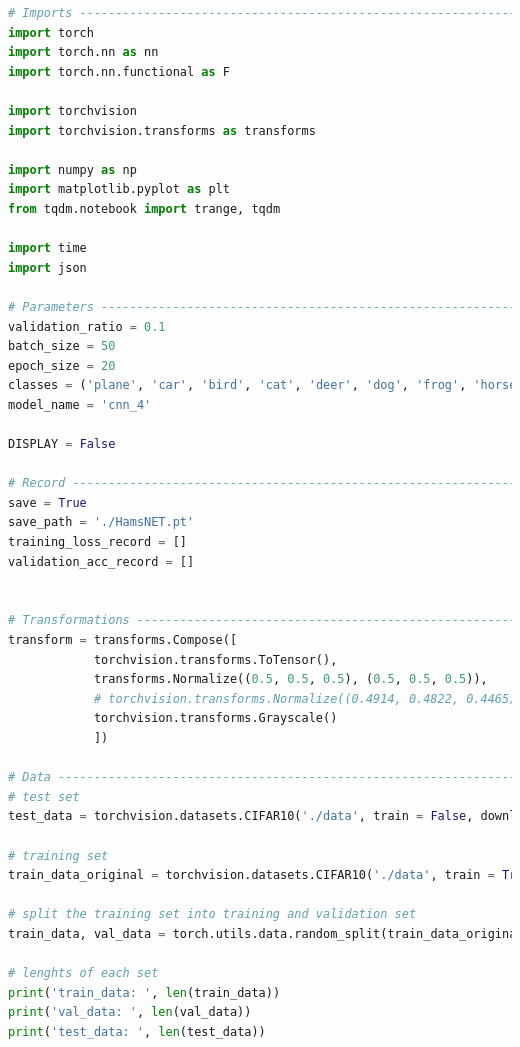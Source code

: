 \documentclass[3p,times,procedia]{elsarticle}
\begin{document}
\begin{lstlisting}[language=Python]
# Imports --------------------------------------------------------------------------------------------------------------------------------------------#
import torch
import torch.nn as nn
import torch.nn.functional as F

import torchvision
import torchvision.transforms as transforms

import numpy as np
import matplotlib.pyplot as plt
from tqdm.notebook import trange, tqdm

import time
import json

# Parameters ------------------------------------------------------------------------------------------------------------------------------------#
validation_ratio = 0.1
batch_size = 50
epoch_size = 20
classes = ('plane', 'car', 'bird', 'cat', 'deer', 'dog', 'frog', 'horse', 'ship', 'truck')
model_name = 'cnn_4'

DISPLAY = False

# Record ----------------------------------------------------------------------------------------------------------------------------------------------#
save = True
save_path = './HamsNET.pt'
training_loss_record = []
validation_acc_record = []


# Transformations ------------------------------------------------------------------------------------------------------------------------------------#
transform = transforms.Compose([
            torchvision.transforms.ToTensor(),
            transforms.Normalize((0.5, 0.5, 0.5), (0.5, 0.5, 0.5)),
            # torchvision.transforms.Normalize((0.4914, 0.4822, 0.4465), (0.247, 0.243, 0.261)),
            torchvision.transforms.Grayscale()
            ])

# Data ----------------------------------------------------------------------------------------------------------------------------------------------#
# test set
test_data = torchvision.datasets.CIFAR10('./data', train = False, download = True, transform = transform)

# training set
train_data_original = torchvision.datasets.CIFAR10('./data', train = True, download = True,transform = transform)

# split the training set into training and validation set
train_data, val_data = torch.utils.data.random_split(train_data_original, [int(len(train_data_original)*(1-validation_ratio)), int(len(train_data_original)*validation_ratio)])

# lenghts of each set
print('train_data: ', len(train_data))
print('val_data: ', len(val_data))
print('test_data: ', len(test_data))


\end{lstlisting}
\end{document}
